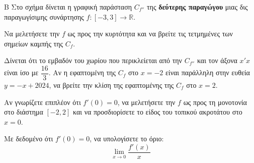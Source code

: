 
\begin{thema}{Β}
Στο σχήμα δίνεται η γραφική παράσταση $C_{f''}$ της \textbf{δεύτερης παραγώγου} μιας δις παραγωγίσιμης συνάρτησης $f:[-3, 3]\to\mathbb{R}$.

\begin{center}
\end{center}

\begin{erwthma}
  \item Να μελετήσετε την $f$ ως προς την κυρτότητα και να βρείτε τις τετμημένες των σημείων καμπής της $C_f$.
  \item Δίνεται ότι το εμβαδόν του χωρίου που περικλείεται από την $C_{f''}$ και τον άξονα $x'x$ είναι ίσο με $\dfrac{16}{3}$. Αν η εφαπτομένη της $C_f$ στο $x=-2$ είναι παράλληλη στην ευθεία $y = -x + 2024$, να βρείτε την κλίση της εφαπτομένης της $C_f$ στο $x=2$.
  \item Αν γνωρίζετε επιπλέον ότι $f'(0) = 0$, να μελετήσετε την $f$ ως προς τη μονοτονία στο διάστημα $[-2, 2]$ και να προσδιορίσετε το είδος του τοπικού ακροτάτου στο $x=0$.
  \item Με δεδομένο ότι $f'(0)=0$, να υπολογίσετε το όριο:
  \[ \lim\limits_{x \to 0} \frac{f'(x)}{x} \]
\end{erwthma}
\end{thema}
